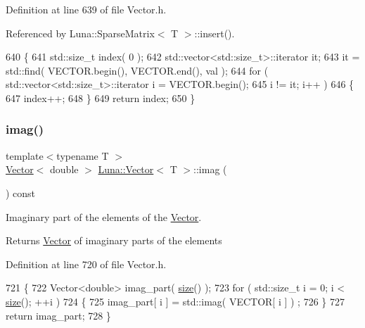 Definition at line 639 of file Vector.\+h.



Referenced by Luna\+::\+Sparse\+Matrix$<$ T $>$\+::insert().


\begin{DoxyCode}
640   \{
641     std::size\_t index( 0 );
642     std::vector<std::size\_t>::iterator it;
643     it = std::find( VECTOR.begin(), VECTOR.end(), val );
644     \textcolor{keywordflow}{for} ( std::vector<std::size\_t>::iterator i = VECTOR.begin();
645           i != it; i++ )
646     \{
647       index++;
648     \}
649     \textcolor{keywordflow}{return} index;
650   \}
\end{DoxyCode}
\mbox{\label{classLuna_1_1Vector_afde9791d85dd530a0e1c9794e8c6534e}} 
\subsubsection{\texorpdfstring{imag()}{imag()}}
{\footnotesize\ttfamily template$<$typename T $>$ \\
\hyperlink{classLuna_1_1Vector}{Vector}$<$ double $>$ \hyperlink{classLuna_1_1Vector}{Luna\+::\+Vector}$<$ T $>$\+::imag (\begin{DoxyParamCaption}{ }\end{DoxyParamCaption}) const\hspace{0.3cm}{\ttfamily [inline]}}



Imaginary part of the elements of the \hyperlink{classLuna_1_1Vector}{Vector}. 

\begin{DoxyReturn}{Returns}
\hyperlink{classLuna_1_1Vector}{Vector} of imaginary parts of the elements 
\end{DoxyReturn}


Definition at line 720 of file Vector.\+h.


\begin{DoxyCode}
721   \{
722     Vector<double> imag\_part( \hyperlink{classLuna_1_1Vector_ac9b6ed7a0df401728f27c193fbc8f4d8}{size}() );
723     \textcolor{keywordflow}{for} ( std::size\_t i = 0; i < \hyperlink{classLuna_1_1Vector_ac9b6ed7a0df401728f27c193fbc8f4d8}{size}(); ++i )
724     \{
725       imag\_part[ i ] = std::imag( VECTOR[ i ] ) ;
726     \}
727     \textcolor{keywordflow}{return} imag\_part;
728   \}
\end{DoxyCode}
\mbox{\label{classLuna_1_1Vector_a5d6821d9dd958423379cafbc6658853f}} 
